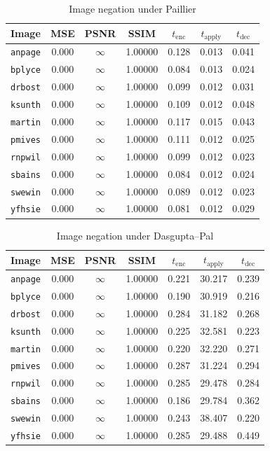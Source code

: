 \begin{table}[h]
	\centering
	\caption{Image negation under Paillier}
	\label{tbl:neg-pal}
    \begin{tabular}{lcccccc}
        \toprule
        Image & MSE  & PSNR & SSIM & $t_\text{enc}$ & $t_\text{apply}$ & $t_\text{dec}$ \\ \midrule
        \texttt{anpage} & 0.000 & $\infty$ & 1.00000 & 0.128 & 0.013 & 0.041 \\
		\texttt{bplyce} & 0.000 & $\infty$ & 1.00000 & 0.084 & 0.013 & 0.024 \\
		\texttt{drbost} & 0.000 & $\infty$ & 1.00000 & 0.099 & 0.012 & 0.031 \\
		\texttt{ksunth} & 0.000 & $\infty$ & 1.00000 & 0.109 & 0.012 & 0.048 \\
		\texttt{martin} & 0.000 & $\infty$ & 1.00000 & 0.117 & 0.015 & 0.043 \\
		\texttt{pmives} & 0.000 & $\infty$ & 1.00000 & 0.111 & 0.012 & 0.025 \\
		\texttt{rnpwil} & 0.000 & $\infty$ & 1.00000 & 0.099 & 0.012 & 0.023 \\
		\texttt{sbains} & 0.000 & $\infty$ & 1.00000 & 0.084 & 0.012 & 0.024 \\
		\texttt{swewin} & 0.000 & $\infty$ & 1.00000 & 0.089 & 0.012 & 0.023 \\
		\texttt{yfhsie} & 0.000 & $\infty$ & 1.00000 & 0.081 & 0.012 & 0.029 \\
		\bottomrule
    \end{tabular}
\end{table}
\begin{table}[h]
	\centering
	\caption{Image negation under Dasgupta--Pal}
	\label{tbl:neg-dp}
    \begin{tabular}{lcccccc}
        \toprule
        Image & MSE  & PSNR & SSIM & $t_\text{enc}$ & $t_\text{apply}$ & $t_\text{dec}$ \\ \midrule
		\texttt{anpage} & 0.000 & $\infty$ & 1.00000 & 0.221 & 30.217 & 0.239 \\
		\texttt{bplyce} & 0.000 & $\infty$ & 1.00000 & 0.190 & 30.919 & 0.216 \\
		\texttt{drbost} & 0.000 & $\infty$ & 1.00000 & 0.284 & 31.182 & 0.268 \\
		\texttt{ksunth} & 0.000 & $\infty$ & 1.00000 & 0.225 & 32.581 & 0.223 \\
		\texttt{martin} & 0.000 & $\infty$ & 1.00000 & 0.220 & 32.220 & 0.271 \\
		\texttt{pmives} & 0.000 & $\infty$ & 1.00000 & 0.287 & 31.224 & 0.294 \\
		\texttt{rnpwil} & 0.000 & $\infty$ & 1.00000 & 0.285 & 29.478 & 0.284 \\
		\texttt{sbains} & 0.000 & $\infty$ & 1.00000 & 0.186 & 29.784 & 0.362 \\
		\texttt{swewin} & 0.000 & $\infty$ & 1.00000 & 0.243 & 38.407 & 0.220 \\
		\texttt{yfhsie} & 0.000 & $\infty$ & 1.00000 & 0.285 & 29.488 & 0.449 \\		
		\bottomrule
        \end{tabular}
\end{table}

